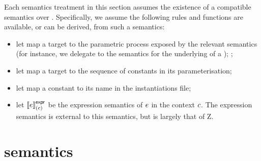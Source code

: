 
Each semantics treatment in this section assumes the existence of a compatible
semantics over \robochart.  Specifically, we assume the following rules and
functions are available, or can be derived, from such a semantics:

\begin{itemize}
\item
	let \targetProcess{-} map a target to the parametric
	process exposed by the relevant \tockcsp{} semantics (for instance,
	we delegate to the \robochart{} semantics for the underlying
	\mrcmodule{} of a \mrcmoduletarget);
	;
\item
	let \targetParams{-} map a target to the sequence of
	constants in its parameterisation;
\item
	let \constName{-} map a constant to its name in the \robochart{}
	instantiations file;
\item
	let \(\llbracket e \rrbracket^{\mathsf{expr}}_{(c)}\) be the expression semantics of 
	\(e\) in the context \(c\).  The expression semantics
	is external to this semantics, but is largely that of Z.
\end{itemize}

\section{\tockcsp{} semantics}\label{sec:semantics-tockcsp}


